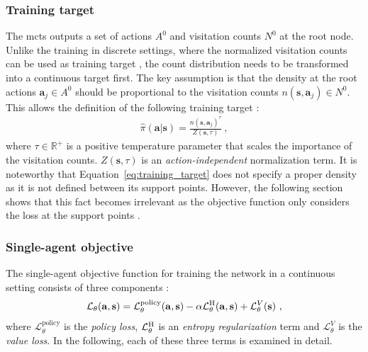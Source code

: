 \subsubsection{Training target}\label{sssec:training_target}
The \gls{mcts} outputs a set of actions $A^0$ and visitation counts $N^0$ at the root node. Unlike the training in discrete settings, where the normalized visitation counts can be used as training target \cite{silverGeneralReinforcementLearning2018}, the count distribution needs to be transformed into a continuous target first. The key assumption is that the density at the root actions $\mathbf a_{j} \in A^0$ should be proportional to the visitation counts $n(\mathbf s, \mathbf a_j) \in N^0$. This allows the definition of the following training target \cite{moerlandA0CAlphaZero2018}:
\begin{gather}\label{eq:training_target}
    \hat{\pi} (\mathbf a| \mathbf s) = \frac{ n(\mathbf s, \mathbf a_j)^\tau }{ Z(\mathbf s, \tau) }~,
\end{gather}
where $\tau \in \mathbb R^+$ is a positive temperature parameter that scales the importance of the visitation counts. $Z(\mathbf s, \tau)$ is an \emph{action-independent} normalization term. It is noteworthy that Equation~\ref{eq:training_target} does not specify a proper density as it is not defined between its support points. However, the following section shows that this fact becomes irrelevant as the objective function only considers the loss at the support points \cite{moerlandA0CAlphaZero2018}.


\subsubsection{Single-agent objective}\label{sssec:single_agent_objective}
The single-agent objective function for training the network in a continuous setting consists of three components \cite{moerlandA0CAlphaZero2018}:
\begin{gather}\label{eq:loss_full}
    \mathcal L_\theta (\mathbf a, \mathbf s) = \mathcal L^{\text{policy}}_\theta(\mathbf a, \mathbf s) - \alpha \mathcal L^{\text H}_\theta (\mathbf a, \mathbf s) + \mathcal L^V_\theta (\mathbf s)~,
\end{gather}
where $\mathcal L^{\text{policy}}_\theta$ is the \emph{policy loss}, $\mathcal L^{\text H}_\theta$ is an \emph{entropy regularization} term and  $\mathcal L^V_\theta$ is the \emph{value loss}. In the following, each of these three terms is examined in detail.

